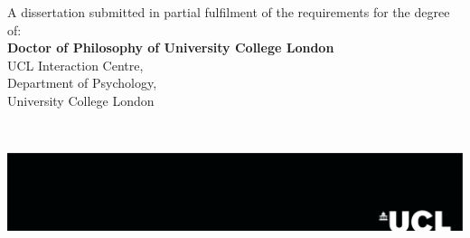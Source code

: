 \begin{titlepage}



\begin{minipage}{\textwidth}
A dissertation submitted in partial fulfilment of the requirements for the degree of: \\

\textbf{Doctor of Philosophy of University College London} \\

UCL Interaction Centre,\\
Department of Psychology, \\
University College London
\end{minipage}
~

\vfill %


\begin{flushright} \large
\includegraphics[width=\textwidth]{images/logo.pdf}%
\end{flushright}


 




\end{titlepage}
%